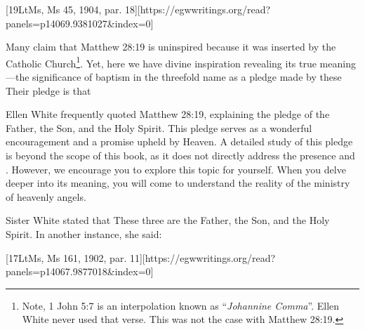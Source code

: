 [19LtMs, Ms 45, 1904, par. 18][https://egwwritings.org/read?panels=p14069.9381027&index=0]

Many claim that Matthew 28:19 is uninspired because it was inserted by the Catholic Church\footnote{Note, 1 John 5:7  is an interpolation known as “\textit{Johannine Comma}”. Ellen White never used that verse. This was not the case with Matthew 28:19.}. Yet, here we have divine inspiration revealing its true meaning—the significance of baptism in the threefold name as a pledge made by these  Their pledge is that 

Ellen White frequently quoted Matthew 28:19, explaining the pledge of the Father, the Son, and the Holy Spirit. This pledge serves as a wonderful encouragement and a promise upheld by Heaven. A detailed study of this pledge is beyond the scope of this book, as it does not directly address the presence and . However, we encourage you to explore this topic for yourself. When you delve deeper into its meaning, you will come to understand the reality of the ministry of heavenly angels.

Sister White stated that  These three are the Father, the Son, and the Holy Spirit. In another instance, she said:

[17LtMs, Ms 161, 1902, par. 11][https://egwwritings.org/read?panels=p14067.9877018&index=0]

